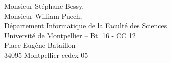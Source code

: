 \documentclass[11pt,origdate]{lettre}
\begin{document}
	\begin{letter}{Monsieur Stéphane Bessy, \\
	Monsieur William Puech,\\
	Département Informatique de la Faculté des Sciences \\
    Université de Montpellier -- Bt. 16 - CC 12 \\
    Place Eugène Bataillon \\
    34095 Montpellier cedex 05} 
		\address{Julien Lesinski \\
		30 rue de la pinède, \\
		résidence La Pinède, bâtiment A\\
		13270 Fos-Sur-Mer, France}
		\nofax %
		
		\francais %
		\pagestyle{empty} %
		
		\conc{}
		\date{\today}
		\signature{\texttt{[image: signature]}}
	
		
		\renewcommand{\concname}{} %
		\renewcommand{\emaillabelname}{} %
		
 		\def\sigspace{10mm} %
		
		\makeatletter
		\def\pict@let@width{185}       %
		\def\pict@let@height{65}       %
		\def\pict@let@hoffset{0}       %
		\def\pict@let@voffset{0}       %
		\def\fromaddress@let@hpos{-10} %
		\def\fromaddress@let@vpos{80}  %
		\fromaddress@let@width=69mm    %
		\def\fromlieu@let@hpos{90}     %
		\def\fromlieu@let@vpos{0}      %
		\fromlieu@let@width=69mm       %
		\def\toaddress@let@hpos{90}    %
		\def\toaddress@let@vpos{40}    %
		\toaddress@let@width=80mm      %
		\makeatother



\end{letter}
\end{document}
